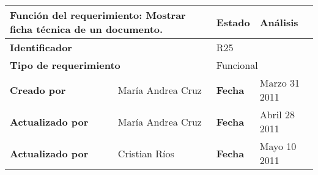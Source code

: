 %
\begin{center}
\begin{longtable}{|p{}|p{}|p{}|p{}|}
\hline
\multicolumn{2}{|p{0.45\textwidth}|}{{\bf {Función del requerimiento:}}
Mostrar ficha técnica de un documento. } & {\bf{ Estado}} & Análisis \\
\hline
\multicolumn{2}{|p{0.45\textwidth}}{\bf Identificador} &
\multicolumn{2}{|p{0.45\textwidth}|}{R25} \\
\hline
\multicolumn{2}{|p{0.45\textwidth}}{\bf {Tipo de requerimiento}} &
\multicolumn{2}{|p{0.45\textwidth}|}{Funcional}\\
\hline
\bf {Creado por} & María Andrea Cruz & \bf {Fecha} & Marzo 31 2011\\
\hline
\bf {Actualizado por} & María Andrea Cruz & \bf {Fecha }& Abril 28 2011\\
\hline
\bf {Actualizado por} & Cristian Ríos  & \bf {Fecha }& Mayo 10 2011\\


\end{longtable}
\end{center}

